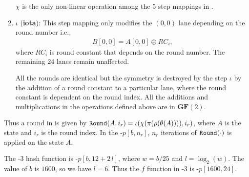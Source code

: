 \begin{enumerate}
    $\chi$ is the only non-linear operation among the $5$ step mappings in \KECCAK{}.
    
    \vskip5pt
    \item $\iota$ ({\bf iota}): This step mapping only modifies the $(0, 0)$ lane depending on the round number i.e., 
    \begin{align}
       B[0, 0] = A[0, 0] \oplus RC_i,
   \end{align}
    where $RC_i$ is round constant that depends on the round number. The remaining $24$ lanes remain unaffected.
    
    All the rounds are identical but the symmetry is destroyed by the step $\iota$ by the addition of a round constant to a particular lane, where the round constant is dependent on the round index.
    All the additions and multiplications in the operations defined above are in $\textbf{GF}(2)$.
\end{enumerate}
Thus a round in \Keccak{} is given by ${\tt Round}(A, i_r) = \iota( \chi( \pi ( \rho ( \theta ( A ) ) ) ) , i_r)$, where $A$ is the state and $i_r$ is the round index. In the \Keccak-$p[b, n_r]$, $n_r$ iterations of ${\tt Round}(\cdot)$ is applied on the state $A$.

The \SHA-$3$ hash function is \Keccak-$p[b, 12 + 2\,l]$, where $w = b/25$ and $l = \log_{2}(w)$. The value of $b$ is $1600$, so we have $l = 6$. Thus the $f$ function in \SHA-$3$ is \Keccak-$p[1600, 24]$.

